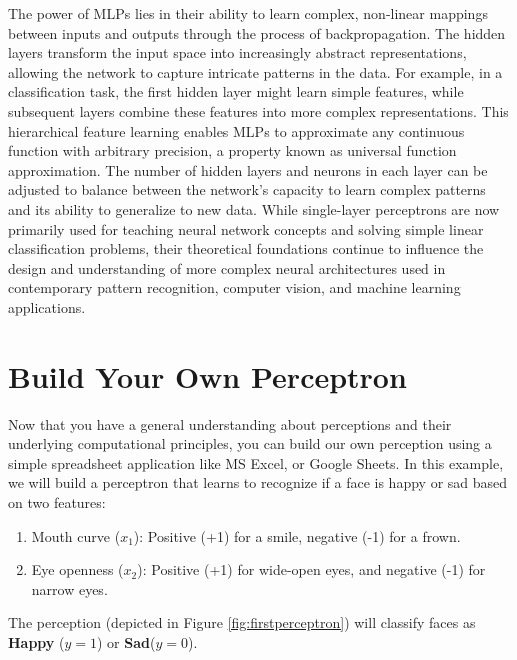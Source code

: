 The power of MLPs lies in their ability to learn complex, non-linear mappings between inputs and outputs through the process of backpropagation. The hidden layers transform the input space into increasingly abstract representations, allowing the network to capture intricate patterns in the data. For example, in a classification task, the first hidden layer might learn simple features, while subsequent layers combine these features into more complex representations. This hierarchical feature learning enables MLPs to approximate any continuous function with arbitrary precision, a property known as universal function approximation. The number of hidden layers and neurons in each layer can be adjusted to balance between the network's capacity to learn complex patterns and its ability to generalize to new data. While single-layer perceptrons are now primarily used for teaching neural network concepts and solving simple linear classification problems, their theoretical foundations continue to influence the design and understanding of more complex neural architectures used in contemporary pattern recognition, computer vision, and machine learning applications.

\section{Build Your Own Perceptron}
Now that you have a general understanding about perceptions and their underlying computational principles, you can build our own perception using a simple spreadsheet application like MS Excel, or Google Sheets. In this example, we will build a perceptron that learns to recognize if a face is happy or sad based on two features:
\begin{enumerate}
\item Mouth curve ($x_1$): Positive (+1) for a smile, negative (-1) for a frown.
\item Eye openness ($x_2$): Positive (+1) for wide-open eyes, and negative (-1) for narrow eyes.
\end{enumerate}
\vspace{.2cm}
\noindent The perception (depicted in Figure \ref{fig:firstperceptron}) will classify faces as \textbf{Happy} ($y=1$) or \textbf{Sad}($y=0$). 

